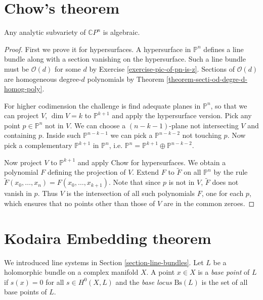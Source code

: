 \documentclass{book}
\begin{document}
\section{Chow's theorem}
\label{section-chow-theorem}

\begin{theorem}[Chow]
\label{theorem-chow}
Any analytic subvariety of $\mathbb{C}P^{n}$
is algebraic.
\end{theorem}

\begin{proof}
First we prove it for hypersurfaces.
A hypersurface in $\mathbb{P}^n$ defines a
line bundle
along with a section vanishing on the
hypersurface.
Such a line bundle must be $\mathcal{O}(d)$
for some $d$
by Exercise \ref{exercise-pic-of-pn-is-z}.
Sections of $\mathcal{O}(d)$ are homogeneous
degree-$d$ polynomials
by Theorem
\ref{theorem-secti-od-degre-d-homog-poly}.

For higher codimension the challenge is find
adequate planes
in $\mathbb{P}^n$, so that we can project
$V$, $\dim V=k$
to $\mathbb{P}^{k+1}$ and apply the
hypersurface version.
Pick any point $p\in \mathbb{P}^n$ not in
$V$.
We can choose a $(n-k-1)$-plane not
intersecting $V$ and containing $p$.
Inside such $\mathbb{P}^{n-k-1}$ we can pick
a $\mathbb{P}^{n-k-2}$
not touching $p$.
Now pick a complementary $\mathbb{P}^{k+1}$
in $\mathbb{P}^n$,
i.e. $\mathbb{P}^n=\mathbb{P}^{k+1}\oplus
\mathbb{P}^{n-k-2}$.

Now project $V$ to $\mathbb{P}^{k+1}$ and
apply Chow for hypersurfaces.
We obtain a polynomial $F$ defining the
projection of $V$.
Extend $F$ to $\tilde{F}$ on all
$\mathbb{P}^n$ by the rule
$\tilde{F}(x_0,…,x_n)=F(x_0,…,x_{k+1})$.
Note that since $p$ is not in $V$,
$\tilde{F}$ does not vanish in $p$.
Thus $V$ is the intersection of all such
polynomials $F$,
one for each $p$, which ensures that no
points other than those
of $V$ are in the common zeroes.
\end{proof}

\section{Kodaira Embedding theorem}
\label{section-kodaira-embedding}

\noindent
We introduced line systems in Section
\ref{section-line-bundles}.
Let $L$ be a holomorphic bundle on a complex
manifold $X$.
A point $x \in X$ is
a {\it base point} of $L$ if $s(x)=0$ for all
$s\in H^{0}(X,L)$
and the {\it base locus} $\text{Bs}(L)$
is the set of all base points of $L$.
\end{document}
